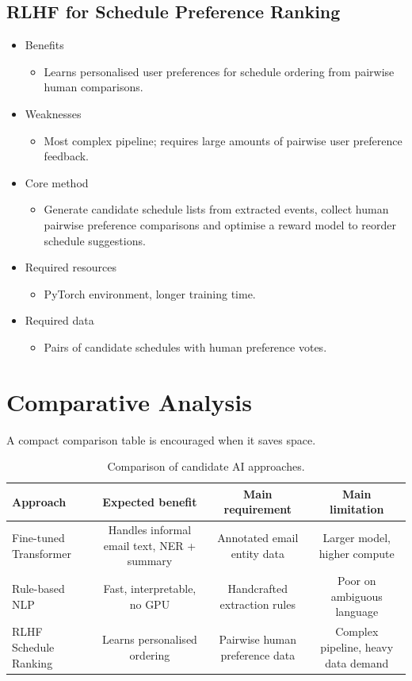 \documentclass{article}
\begin{document}
\subsection{RLHF for Schedule Preference Ranking}
\begin{itemize}
  \item Benefits
    \begin{itemize}
      \item Learns personalised user preferences for schedule ordering from pairwise human comparisons.
    \end{itemize}
  \item Weaknesses
    \begin{itemize}
      \item Most complex pipeline; requires large amounts of pairwise user preference feedback.
    \end{itemize}
  \item Core method
    \begin{itemize}
      \item Generate candidate schedule lists from extracted events, collect human pairwise preference comparisons and optimise a reward model to reorder schedule suggestions.
    \end{itemize}
  \item Required resources
    \begin{itemize}
      \item PyTorch environment, longer training time.
    \end{itemize}
  \item Required data
    \begin{itemize}
      \item Pairs of candidate schedules with human preference votes.
    \end{itemize}
\end{itemize}

\section{Comparative Analysis}
A compact comparison table is encouraged when it saves space.
\begin{table}[t]
  \centering
  \caption{Comparison of candidate AI approaches.}\label{tab:approach-comparison}
  \begin{tabular}{lccc}
    \toprule
    Approach & Expected benefit & Main requirement & Main limitation \\
    \midrule
    Fine-tuned Transformer & Handles informal email text, NER + summary & Annotated email entity data & Larger model, higher compute \\
    Rule-based NLP & Fast, interpretable, no GPU & Handcrafted extraction rules & Poor on ambiguous language \\
    RLHF Schedule Ranking & Learns personalised ordering & Pairwise human preference data & Complex pipeline, heavy data demand \\
    \bottomrule
  \end{tabular}
\end{table}
\end{document}
